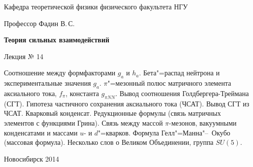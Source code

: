 \documentclass[12pt,pagesize,paper=landscape,paper=192mm:108mm]{scrbook}
\begin{document}
\begin{titlepage}
\begin{center}
    Кафедра теоретической физики физического факультета НГУ
    \medskip

    \Large
    Профессор Фадин В.\,С.

    \huge
    \textbf{Теория сильных взаимодействий}
    \smallskip
    
    \Large
    Лекция № 14
    \vfill
    
    \normalsize
    \begin{minipage}{0.9\linewidth}
      Соотношение между формфакторами $g_a$ и $h_a$. Бета"=распад
      нейтрона и экспериментальные значения $g_a$. $\pi$"=мезонный
      полюс матричного элемента аксиального тока, $f_{\pi}$, константа
      $g_{\pi NN}$. Вывод соотношения Голдбергера-Треймана (СГТ). Гипотеза
      частичного сохранения аксиального тока (ЧСАТ). Вывод СГТ из
      ЧСАТ. Кварковый конденсат. Редукционные формулы (связь матричных
      элементов с функциями Грина). Связь между массой $\pi$-мезонов,
      вакуумными конденсатами и массами $u$- и $d$"=кварков. Формула
      Гелл"=Манна"--~Окубо (массовая формула). Несколько слов о Великом
      Объединении, группа $SU(5)$.
    \end{minipage}
    \vfill
    
    \normalsize \ccbysa\hspace{0.5em}  Новосибирск 2014   
  \end{center}
\end{titlepage}
\end{document}
